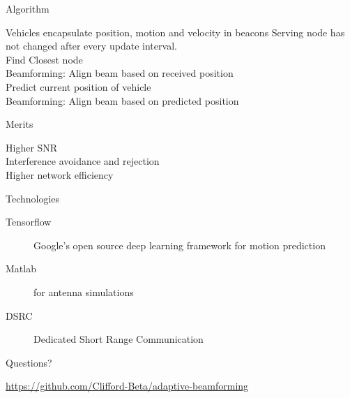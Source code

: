 \documentclass[10pt]{beamer}
\begin{document}
\begin{frame}{Algorithm}
\begin{algorithmic}
\Require Vehicles encapsulate position, motion and velocity in beacons
\Ensure Serving node has not changed after every update interval.
\\Find Closest node 
 \\Beamforming: Align beam based on received position
\Else
\\Predict current position of vehicle \\
 Beamforming: Align beam based on predicted position
 \EndIf
\EndIf
\end{algorithmic}
\end{frame}

\begin{frame}{Merits}
	\begin{description}
		\item [Higher SNR] 
		\item [Interference avoidance and rejection] 
		\item [Higher network efficiency] 
	\end{description}
\end{frame}

\begin{frame}{Technologies}
	\begin{description}
		\item [Tensorflow]  Google's open source deep learning framework for motion prediction
		\item [Matlab] for antenna simulations
		\item [DSRC] Dedicated Short Range Communication
	\end{description}
\end{frame}

{
\begin{frame}[standout]
  Questions?
\end{frame}
}

\begin{frame}[standout]
  \url{https://github.com/Clifford-Beta/adaptive-beamforming}
\end{frame}
\end{document}
